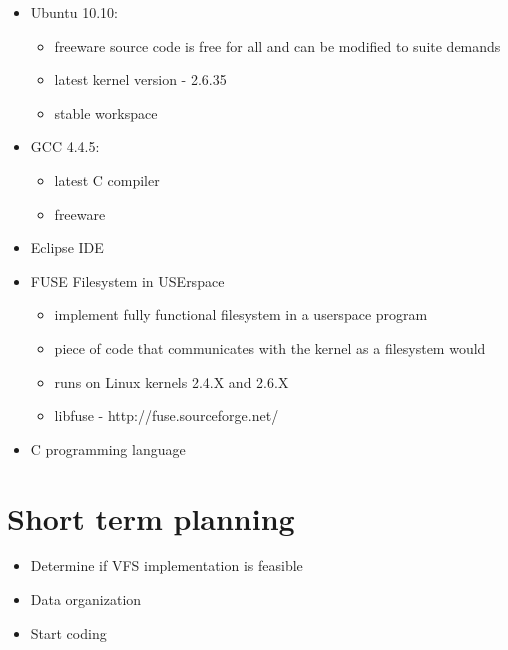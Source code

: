 \documentclass{beamer}
\begin{document}
\begin{frame}
  \begin{itemize}
  \item Ubuntu 10.10:
	\begin{itemize}  
	\item freeware  source code is free for all and can be modified to suite demands
	\item latest kernel version - 2.6.35 
	\item stable workspace
	\end{itemize}
  \item GCC 4.4.5:
	\begin{itemize} 	
	\item latest C compiler
	\item freeware
	\end{itemize}
  \item Eclipse IDE
  \end{itemize}
\end{frame}

\begin{frame}
  \begin{itemize}
  \item FUSE  Filesystem in USErspace
	\begin{itemize}
	\item implement fully functional filesystem in a userspace program 
	\item piece of code that communicates with the kernel as a filesystem would
	\item runs on Linux kernels 2.4.X and 2.6.X
    \item libfuse - http://fuse.sourceforge.net/
    \end{itemize}
  \item C programming language
  \end{itemize}
\end{frame}

\section{Short term planning}

\begin{frame}
  \begin{itemize}
    \item Determine if VFS implementation is feasible
    \item Data organization
    \item Start coding
  \end{itemize}
\end{frame}
\end{document}
